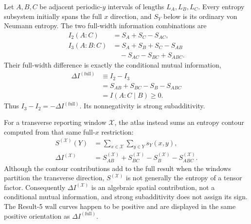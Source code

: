\documentclass[aps,prb,twocolumn,floatfix,nofootinbib,superscriptaddress]{revtex4-2}
\begin{document}
Let $A,B,C$ be adjacent periodic-$y$ intervals of lengths $L_A,L_B,L_C$.  Every entropy
subsystem initially spans the full $x$ direction, and $S_Y$ below is its ordinary von
Neumann entropy.  The two full-width information combinations are
\begin{align}
 I_2(A:C)&=S_A+S_C-S_{AC},\nonumber\\
 I_3(A:B:C)&=S_A+S_B+S_C-S_{AB}\nonumber\\
 &\quad-S_{AC}-S_{BC}+S_{ABC}.
 \label{eq:tmi-definitions}
\end{align}
Their full-width difference is exactly the conditional mutual information,
\begin{equation}
 \begin{aligned}
 \Delta I^{(\mathrm{full})}&\equiv I_2-I_3\\
 &=S_{AB}+S_{BC}-S_B-S_{ABC}\\
 &=I(A:C\mid B)\geq0.
 \end{aligned}
 \label{eq:tmi-conditional-mi}
\end{equation}
Thus $I_3-I_2=-\Delta I^{(\mathrm{full})}$.  Its nonnegativity is strong
subadditivity.

For a transverse reporting window $\mathcal X$, the atlas instead sums an entropy
contour computed from that same full-$x$ restriction:
\begin{align}
 S^{(\mathcal X)}(Y)
 &=\sum_{x\in\mathcal X}\sum_{y\in Y}s_Y(x,y),
 \label{eq:tmi-contour-restriction}\\
 \Delta I^{(\mathcal X)}
 &=S_{AB}^{(\mathcal X)}+S_{BC}^{(\mathcal X)}
 -S_B^{(\mathcal X)}-S_{ABC}^{(\mathcal X)}.
 \label{eq:tmi-contour-combination}
\end{align}
Although the contour contributions add to the full result when the windows partition
the transverse direction, $S^{(\mathcal X)}$ is not generally the entropy of a tensor
factor.  Consequently $\Delta I^{(\mathcal X)}$ is an algebraic spatial contribution,
not a conditional mutual information, and strong subadditivity does not assign its sign.
The Result-5 wall curves happen to be positive and are displayed in the same positive
orientation as $\Delta I^{(\mathrm{full})}$.
\end{document}
